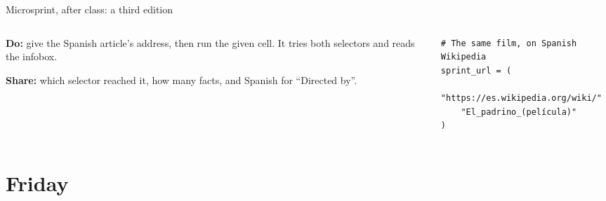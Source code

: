 \documentclass[9pt,aspectratio=169]{beamer}
\begin{document}
\begin{frame}[fragile]{Microsprint, after class: a third edition}
    \begin{columns}[T]
        \begin{column}{0.37\textwidth}
            \textbf{Do:} give the Spanish article's address, then run the given cell. It tries both selectors and reads the infobox.

            \medskip
            \textbf{Share:} which selector reached it, how many facts, and Spanish for ``Directed by''.
        \end{column}
        \begin{column}{0.6\textwidth}
\begin{lstlisting}
# The same film, on Spanish Wikipedia
sprint_url = (
    "https://es.wikipedia.org/wiki/"
    "El_padrino_(película)"
)
\end{lstlisting}
        \end{column}
    \end{columns}
\end{frame}

\section{Friday}
\end{document}
